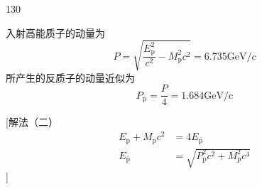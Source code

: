 \begin{solution}{130}
    \begin{subsolution}
        入射高能质子的动量为
        \begin{equation}
            P = \sqrt {\frac {E _ {\mathrm{p}} ^ {2}}{c ^ {2}} - M _ {\mathrm{p}} ^ {2} c ^ {2}} = 6.735 \mathrm{GeV} / c
            \label{eq:1.s130}
        \end{equation}
        所产生的反质子的动量近似为
        \begin{equation}
            P _ {\overline {{\mathrm{p}}}} = \frac {P}{4} = 1.684 \mathrm{GeV/c}
            \label{eq:2.s130}
        \end{equation}

        [解法（二）
        \begin{align}
            E _ {\mathrm{p}} + M _ {\mathrm{p}} c ^ {2} &= 4 E _ {\overline {{\mathrm{p}}}} \label{eq:3.s130} \\
            E _ {\overline {{\mathrm{p}}}} &= \sqrt {P _ {\overline {{\mathrm{p}}}} ^ {2} c ^ {2} + M _ {\mathrm{p}} ^ {2} c ^ {4}} \label{eq:4.s130}
        \end{align}
        ]


\end{subsolution}
\end{solution}
